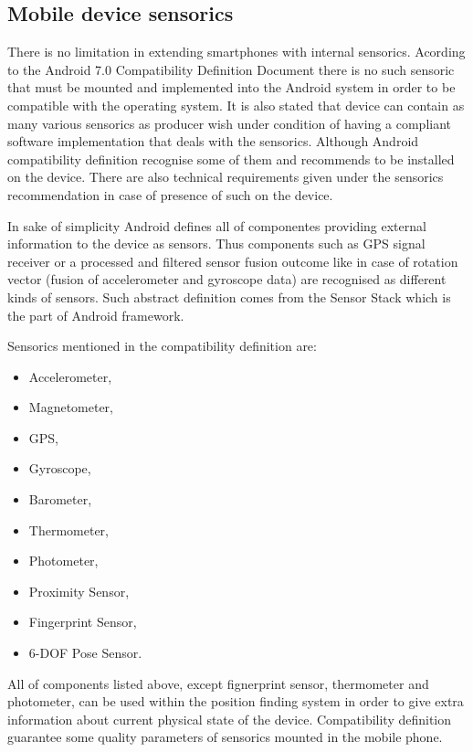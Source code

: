 \documentclass[../main.tex]{subfiles}
\begin{document}
\subsection{Mobile device sensorics}

There is no limitation in extending smartphones with internal sensorics. Acording to the Android 7.0 Compatibility Definition Document\cite{android7.0_cdd} there is no such sensoric that must be mounted and implemented into the Android system in order to be compatible with the operating system. It is also stated that device can contain as many various sensorics as producer wish under condition of having a compliant software implementation that deals with the sensorics. Although Android compatibility definition recognise some of them and recommends to be installed on the device. There are also technical requirements given under the sensorics recommendation in case of presence of such on the device.

In sake of simplicity Android defines all of componentes providing external information to the device as sensors. Thus components such as GPS signal receiver or a processed and filtered sensor fusion outcome like in case of rotation vector (fusion of accelerometer and gyroscope data) are recognised as different kinds of sensors. Such abstract definition comes from the Sensor Stack which is the part of Android framework.

Sensorics mentioned in the compatibility definition are:
\begin{itemize}
 	\item Accelerometer,
	\item Magnetometer,
	\item GPS,
	\item Gyroscope,
	\item Barometer,
	\item Thermometer,
	\item Photometer,
	\item Proximity Sensor,
	\item Fingerprint Sensor,
	\item 6-DOF Pose Sensor.
 \end{itemize}

All of components listed above, except fignerprint sensor, thermometer and photometer, can be used within the position finding system in order to give extra information about current physical state of the device. Compatibility definition guarantee some quality parameters of sensorics mounted in the mobile phone.
\end{document}
